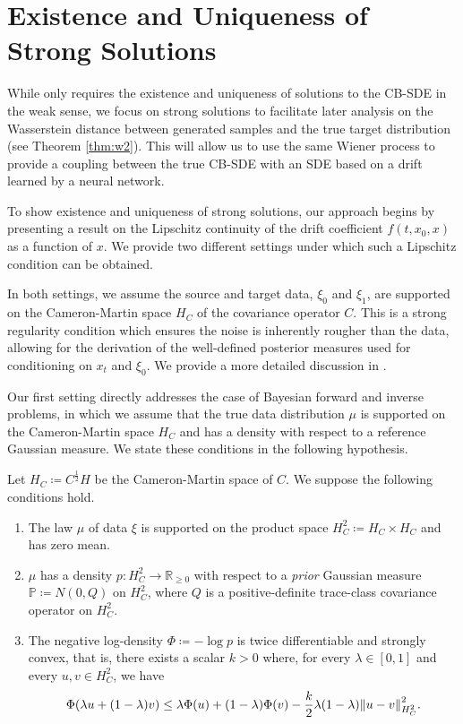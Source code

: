 
\section{Existence and Uniqueness of Strong Solutions}\label{sec:eu}
While  only requires the existence and uniqueness of solutions to the CB-SDE in the weak sense, we focus on strong solutions to facilitate later analysis on the Wasserstein distance between generated samples and the true target distribution (see Theorem \ref{thm:w2}). This will allow us to use the same Wiener process to provide a coupling between the true CB-SDE with an SDE based on a drift learned by a neural network.

To show existence and uniqueness of strong solutions, our approach begins by presenting a result on the Lipschitz continuity of the drift coefficient \(f(t, x_{0}, x)\) as a function of \(x\). We provide two different settings under which such a Lipschitz condition can be obtained.

In both settings, we assume the source and target data, \(\xi_{0}\) and \(\xi_{1}\), are supported on the Cameron-Martin space \(H_{C}\) of the covariance operator \(C\). This is a strong regularity condition which ensures the noise is inherently rougher than the data, allowing for the derivation of the well-defined posterior measures used for conditioning on \(x_{t}\) and \(\xi_{0}\). We provide a more detailed discussion in .

Our first setting directly addresses the case of Bayesian forward and inverse problems, in which we assume that the true data distribution \(\mu\) is supported on the Cameron-Martin space \(H_{C}\) and has a density with respect to a reference Gaussian measure. We state these conditions in the following hypothesis.

\begin{hypothesis}\label{hyp:bayes}
  Let \(H_{C} \coloneqq C^{\frac{1}{2}}H\) be the Cameron-Martin space of \(C\). We suppose the following conditions hold.
  \begin{enumerate}[label=\roman*]
    \item \label{hyp1.1} The law \(\mu\) of data \(\xi\) is supported on the product space \(H_{C}^{2} \coloneqq H_{C} \times H_{C} \) and has zero mean.
    \item \label{hyp1.2} \(\mu\) has a density \(p : H^{2}_{C} \to \mathbb{R}_{\geq 0}\) with respect to a \textit{prior} Gaussian measure \(\mathbb{P} \coloneqq N(0, Q)\) on \(H^{2}_{C}\), where \(Q\) is a positive-definite trace-class covariance operator on \(H_{C}^{2}\).
    \item \label{hyp1.3} The negative log-density \(\Phi \coloneqq - \log p\) is twice differentiable and strongly convex, that is, there exists a scalar \(k > 0\) where, for every \(\lambda \in [0, 1]\) and every \(u, v \in H^{2}_{C}\), we have
      \[
        \Phi(\lambda u + (1 - \lambda)v) \leq \lambda \Phi(u) + (1 - \lambda) \Phi(v) - \frac{k}{2}\lambda(1-\lambda) \norm{u - v}^{2}_{H^{2}_{C}}.
      \]
  \end{enumerate}
\end{hypothesis}

